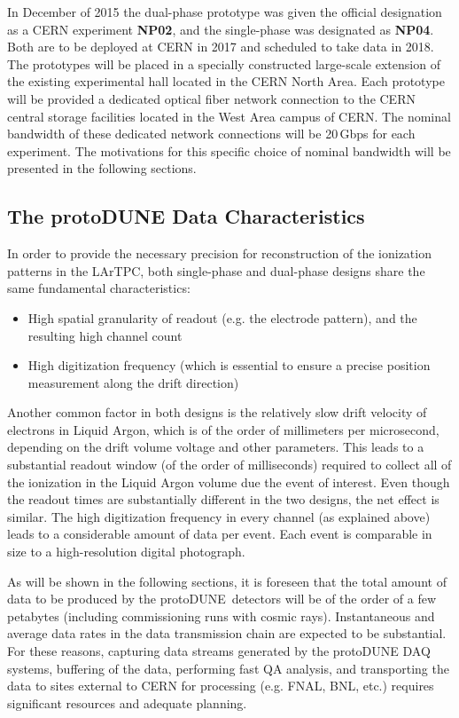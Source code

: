 \documentclass[pdftex,12pt,letter]{article}
\newcommand{\pd}{protoDUNE\ }
\begin{document}
In December of 2015 the dual-phase prototype was given the official designation as a CERN experiment \textbf{NP02}, and the single-phase was
designated as \textbf{NP04}. Both are to be deployed at CERN in 2017 and scheduled to take data in 2018. The prototypes will be placed in a specially
constructed large-scale extension of the existing experimental hall located in the CERN North Area. Each prototype will be provided a dedicated
optical fiber network connection to the CERN central storage facilities located in the West Area campus of CERN. The nominal bandwidth of these
dedicated network connections will be 20\,Gbps for each experiment. The motivations for this specific choice of nominal bandwidth will be
presented in the following sections.

\subsection{The protoDUNE Data Characteristics}

In order to provide the necessary precision for reconstruction of the ionization patterns in the LArTPC, both single-phase and dual-phase designs share the same fundamental characteristics:
\begin{itemize}
\item High spatial granularity of readout (e.g. the electrode pattern), and the resulting high channel count
\item High digitization frequency (which is essential to ensure a precise position measurement along the drift direction)
\end{itemize}

\noindent
Another common factor in both designs is the relatively slow drift velocity of electrons in Liquid Argon, which is of the order of millimeters per microsecond,
depending on the drift volume voltage and other parameters. This leads to a substantial readout window (of the order of milliseconds) required to collect
all of the ionization in the Liquid Argon volume due the event of interest. Even though the readout times are substantially different in the two designs,
the net effect is similar. The high digitization frequency in every channel (as explained above) leads to a considerable amount of data per event.
 Each event is comparable in size to a high-resolution digital photograph.

As will be shown in the following sections, it is foreseen that the total amount of data to be produced by the \pd detectors will be of the order of a few
petabytes (including commissioning runs with cosmic rays). Instantaneous and average data rates in the data transmission chain are expected to be
substantial. For these reasons, capturing data streams generated by the protoDUNE DAQ systems, buffering of the data, performing fast QA analysis,
and transporting the data to sites external to CERN for processing (e.g. FNAL, BNL, etc.) requires significant resources and adequate planning.
\end{document}
